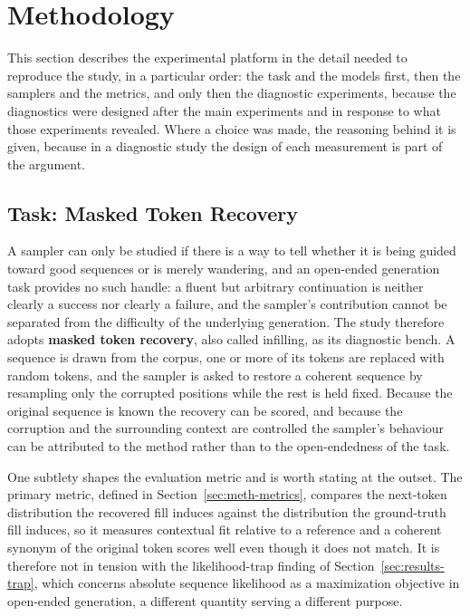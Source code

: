 \section{Methodology}
\label{ch:methodology}

This section describes the experimental platform in the detail needed to reproduce the study, in a particular order: the task and the models first, then the samplers and the metrics, and only then the diagnostic experiments, because the diagnostics were designed after the main experiments and in response to what those experiments revealed. Where a choice was made, the reasoning behind it is given, because in a diagnostic study the design of each measurement is part of the argument.

\subsection{Task: Masked Token Recovery}
\label{sec:meth-task}

A sampler can only be studied if there is a way to tell whether it is being guided toward good sequences or is merely wandering, and an open-ended generation task provides no such handle: a fluent but arbitrary continuation is neither clearly a success nor clearly a failure, and the sampler's contribution cannot be separated from the difficulty of the underlying generation. The study therefore adopts \textbf{masked token recovery}, also called infilling, as its diagnostic bench. A sequence is drawn from the corpus, one or more of its tokens are replaced with random tokens, and the sampler is asked to restore a coherent sequence by resampling only the corrupted positions while the rest is held fixed. Because the original sequence is known the recovery can be scored, and because the corruption and the surrounding context are controlled the sampler's behaviour can be attributed to the method rather than to the open-endedness of the task.

One subtlety shapes the evaluation metric and is worth stating at the outset. The primary metric, defined in Section~\ref{sec:meth-metrics}, compares the next-token distribution the recovered fill induces against the distribution the ground-truth fill induces, so it measures contextual fit relative to a reference and a coherent synonym of the original token scores well even though it does not match. It is therefore not in tension with the likelihood-trap finding of Section~\ref{sec:results-trap}, which concerns absolute sequence likelihood as a maximization objective in open-ended generation, a different quantity serving a different purpose.

